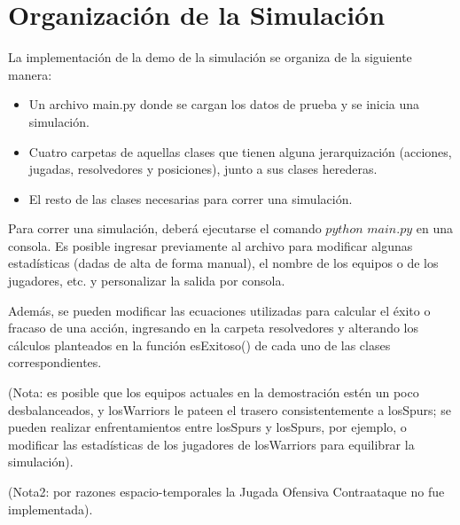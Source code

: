 \section{Organización de la Simulación}
La implementación de la demo de la simulación se organiza de la siguiente manera:
\begin{itemize}
 \item Un archivo main.py donde se cargan los datos de prueba y se inicia una simulación.
 \item Cuatro carpetas de aquellas clases que tienen alguna jerarquización (acciones, jugadas, resolvedores y posiciones), junto a sus clases herederas.
 \item El resto de las clases necesarias para correr una simulación.
\end{itemize}

Para correr una simulación, deberá ejecutarse el comando $python$ $main.py$ en una consola. Es posible ingresar previamente al archivo para modificar algunas estadísticas (dadas de alta de forma manual), el nombre de los equipos o de los jugadores, etc. y personalizar la salida por consola.

Además, se pueden modificar las ecuaciones utilizadas para calcular el éxito o fracaso de una acción, ingresando en la carpeta resolvedores y alterando los cálculos planteados en la función esExitoso() de cada uno de las clases correspondientes. 

(Nota: es posible que los equipos actuales en la demostración estén un poco desbalanceados, y losWarriors le pateen el trasero consistentemente a losSpurs; se pueden realizar enfrentamientos entre losSpurs y losSpurs, por ejemplo, o modificar las estadísticas de los jugadores de losWarriors para equilibrar la simulación).

(Nota2: por razones espacio-temporales la Jugada Ofensiva Contraataque no fue implementada).